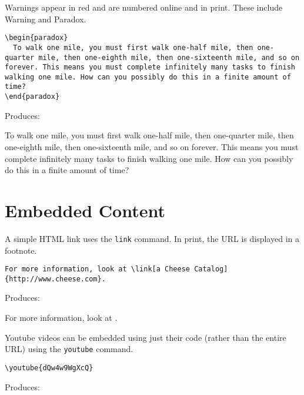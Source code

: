 \documentclass{ximera}
\begin{document}
\begin{example} Warnings appear in red and are numbered online and in print. These include Warning and Paradox.

\begin{verbatim}
\begin{paradox}
  To walk one mile, you must first walk one-half mile, then one-quarter mile, then one-eighth mile, then one-sixteenth mile, and so on forever. This means you must complete infinitely many tasks to finish walking one mile. How can you possibly do this in a finite amount of time?
\end{paradox}
\end{verbatim}

Produces:

\begin{paradox}
  To walk one mile, you must first walk one-half mile, then one-quarter mile, then one-eighth mile, then one-sixteenth mile, and so on forever. This means you must complete infinitely many tasks to finish walking one mile. How can you possibly do this in a finite amount of time?
\end{paradox}
\end{example}

\section{Embedded Content} \label{EmbeddedContent}

\begin{example} A simple HTML link uses the \verb!link! command. In print, the URL is displayed in a footnote.

\begin{verbatim}
For more information, look at \link[a Cheese Catalog]{http://www.cheese.com}.
\end{verbatim}

Produces:

For more information, look at .
\end{example}

\begin{example} Youtube videos can be embedded using just their code (rather than the entire URL) using the \verb!youtube! command.

\begin{verbatim}
\youtube{dQw4w9WgXcQ}
\end{verbatim}

Produces:

\end{example}
\end{document}
